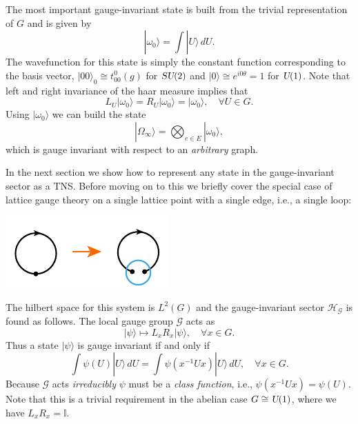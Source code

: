 \documentclass[twocolumn,lengthcheck,superscriptaddress]{revtex4-1}
\def\su2{\textsl{SU}(2)}
\def\uone{\textsl{U}(1)}
\theoremstyle{definition}
\theoremstyle{remark}
\begin{document}
The most important gauge-invariant state is built from the trivial representation of $G$ and is given by
\begin{equation}
	|\omega_0\rangle = \int |U\rangle\, dU.
\end{equation}
The wavefunction for this state is simply the constant function corresponding to the basis vector, $|00\rangle_0 \cong t^0_{00}(g)$ for $\su2$ and $|0\rangle \cong e^{i0\theta} = 1$ for $\uone$. 
Note that left and right invariance of the haar measure implies that
\begin{equation}
	L_U|\omega_0\rangle = R_U|\omega_0\rangle = |\omega_0\rangle, \quad \forall U\in G.
\end{equation}
Using $|\omega_0\rangle$ we can build the state 
\begin{equation}
	|\Omega_\infty\rangle = \bigotimes_{e\in E} |\omega_0\rangle,
\end{equation}
which is gauge invariant with respect to an \emph{arbitrary} graph.

In the next section we show how to represent any state in the gauge-invariant sector as a TNS. Before moving on to this we briefly cover the special case of lattice gauge theory on a single lattice point with a single edge, i.e., a single loop:
\begin{center}
	\includegraphics{singlevertex.pdf}
\end{center}
The hilbert space for this system is $L^2(G)$ and the gauge-invariant sector $\mathcal{H}_{\mathcal{G}}$ is found as follows. The local gauge group $\mathcal{G}$ acts as
\begin{equation}
	|\psi\rangle \mapsto L_xR_x |\psi\rangle, \quad \forall x\in G.
\end{equation}
Thus a state $|\psi\rangle$ is gauge invariant if and only if
\begin{equation}\label{eq:classstate}
	\int \psi(U) |U\rangle\, dU = \int  \psi(x^{-1}Ux) |U\rangle\, dU, \quad\forall x\in G.
\end{equation}
Because $\mathcal{G}$ acts \emph{irreducibly} $\psi$ must be a \emph{class function}, i.e., $\psi(x^{-1}Ux) = \psi(U)$. Note that this is a trivial requirement in the abelian case $G \cong \uone$, where we have $L_xR_x = \mathbb{I}$.
\end{document}

